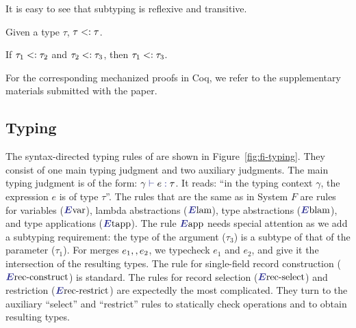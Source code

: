 
It is easy to see that subtyping is reflexive and transitive.

\begin{lemma} \label{sub-refl}
Given a type $ \tau $, $ \tau <: \tau $.
\end{lemma}

\begin{lemma} \label{sub-trans}
If $ \tau_1 <: \tau_2 $ and $ \tau_2 <: \tau_3 $,
then $ \tau_1 <: \tau_3 $.
\end{lemma}

For the corresponding mechanized proofs in Coq, we refer to the supplementary
materials submitted with the paper.

\subsection{Typing}

\begin{figure*}
  \small
  
  \caption{The type system of \name.}
  \label{fig:fi-typing}
\end{figure*}

The syntax-directed typing rules of \name are shown in Figure~\ref{fig:fi-typing}. They consist of one
main typing judgment and two auxiliary judgments. The main typing judgment is of
the form: $ \judgeSource \gamma e \tau $. It reads: ``in the typing context
$\gamma$, the expression $e$ is of type $\tau$''. The rules that are the same as
in System $F$ are rules for variables ($\ruleLabelSourceVar$), lambda abstractions
($\ruleLabelSourceLam$), type abstractions ($\ruleLabelSourceBLam$), and type applications
($\ruleLabelSourceTApp$). The rule $\ruleLabelSourceApp$ needs special attention as we add
a subtyping requirement: the type of the argument ($\tau_3$) is a
subtype of that of the parameter ($\tau_1$).
For merges
$e_1 ,, e_2$, we typecheck $e_1$ and $e_2$, and give it the
intersection of the resulting types. The rule for
single-field record construction ($\ruleLabelSourceRecConstruct$) is standard. The rules
for record selection ($\ruleLabelSourceRecSelect$) and restriction
($\ruleLabelSourceRecRestrict$) are expectedly the most complicated. They turn to the
auxiliary ``select'' and ``restrict'' rules to statically check operations and
to obtain resulting types.

